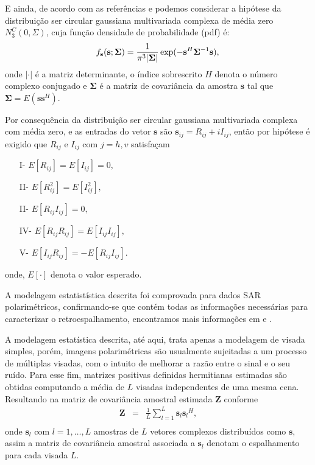 \documentclass[conference]{IEEEtran}
\begin{document}
E ainda, de acordo com as referências \cite{good} e \cite{lee} podemos considerar a hipótese da distribuição ser circular gaussiana multivariada complexa de média zero $N^C_3(0,\Sigma)$, cuja função densidade de probabilidade (pdf) é:
\begin{equation}\label{eq_03}
    f_{\mathbf{s}}(\mathbf{s};\mathbf{\Sigma})=\frac{1}{\pi^3|\mathbf{\Sigma}|} \exp(-\mathbf{s}^H\mathbf{\Sigma}^{-1}\mathbf{s}), \\
\end{equation}
onde $|\cdot|$ é a matriz determinante, o índice sobrescrito $H$ denota o número complexo conjugado e $\mathbf{\Sigma}$ é a matriz de covariância da amostra $\mathbf{s}$ tal que $\mathbf{\Sigma}=E(\mathbf{ss}^H)$. 

Por consequência da distribuição ser circular gaussiana multivariada complexa com média zero, e as entradas do vetor $\mathbf{s}$ são $\mathbf{s}_{ij}= R_{ij}+ i I_{ij}$, então por hipótese é exigido que $R_{ij}$ e $I_{ij}$ com $j=h,v$ satisfaçam 
\begin{itemize}
	\item[I-] $E[R_{ij}]=E[I_{ij}]=0,$
	\item[II-] $E[R_{ij}^2]=E[I_{ij}^2],$ 
	\item[II-] $E[R_{ij}I_{ij}]=0,$  
	\item[IV-] $E[R_{ij}R_{ij}]=E[I_{ij}I_{ij}],$ 
	\item[V-] $E[I_{ij}R_{ij}]=-E[R_{ij}I_{ij}].$
\end{itemize}
onde, $E[\cdot]$ denota o valor esperado. 

A modelagem estatistística descrita foi comprovada para dados SAR polarimétricos, confirmando-se que contém todas as informações necessárias para caracterizar o retroespalhamento, encontramos mais informações em \cite{sarabendi} e \cite{mfp}.
 
A modelagem estatística descrita, até aqui, trata apenas a modelagem de visada simples, porém, imagens polarimétricas são usualmente sujeitadas a um processo de múltiplas visadas, com o intuito de melhorar a razão entre o sinal e o seu ruído. Para esse fim, matrizes positivas definidas hermitianas estimadas são obtidas computando a média de $L$ visadas independentes de uma mesma cena. Resultando na matriz de covariância amostral estimada {\bf Z} conforme \cite{good, ade}
\begin{equation}\label{eq_04}
\begin{array}{ccc}
    \mathbf{Z}&=&\frac{1}{L}\displaystyle{\sum_{l=1}^{L} {\mathbf{s}_l}{\mathbf{s}_l}^H}, \\
\end{array}
\end{equation}
onde $\mathbf{s}_l$ com $l = 1, \dots, L$ amostras de $\mathit{L}$ vetores complexos distribuídos como $\mathbf{s}$, assim a matriz de covariância amostral associada a $\mathbf{s}_l$ denotam o espalhamento para cada visada $L$.
\end{document}
